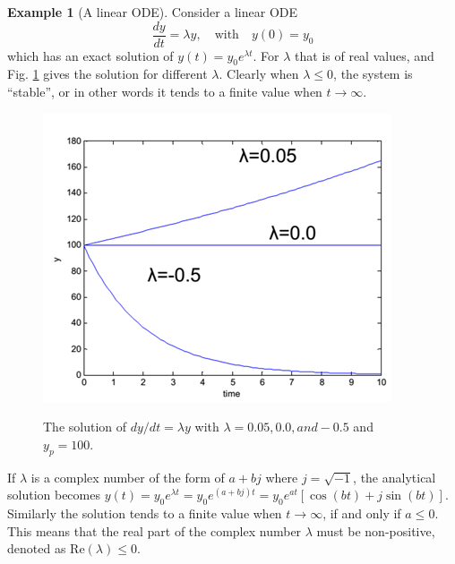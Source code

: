\documentclass[a4paper,11pt]{article}
\theoremstyle{definition}
\newtheorem{exmp}{Example}[section]
\begin{document}
\begin{exmp}[A linear ODE]
\label{exmp:stab_linear}
Consider a linear ODE
\begin{equation} \label{eq:stab_lin}
	\frac{d y}{d t} = \lambda y, \quad \textrm{with} \quad y(0) = y_0
\end{equation}
\noindent which has an exact solution of $y(t) = y_0 e^{\lambda t}$.
For $\lambda$ that is of real values, and Fig. \ref{fig:stab_lin}
gives the solution for different $\lambda$. Clearly when $\lambda \leq 0$, the system is ``stable'',
or in other words it tends to a finite value when $t \to \infty$.
\begin{figure} [!h]
 \begin{center}
	\includegraphics[width=.5\textwidth]{stab_lin}\\
 \end{center}
 \caption{The solution of $dy/dt=\lambda y$ with $\lambda=0.05, 0.0, and -0.5$ and $y_p=100$.} 
 \label{fig:stab_lin}
\end{figure}

If $\lambda$ is a complex number of the form of $a + b j$ where $j=\sqrt{-1}$,
the analytical solution becomes $y(t) = y_0 e^{\lambda t} = y_0 e^{(a+b j) t} = y_0 e^{a t} [ \cos (bt) + j \sin (bt) ] $.
Similarly the solution tends to a finite value when $t \to \infty$, if and only if $a \leq 0$. This means that
the real part of the complex number $\lambda$ must be non-positive, denoted as
$\textrm{Re}(\lambda) \leq 0$.
\end{exmp}
\end{document}
